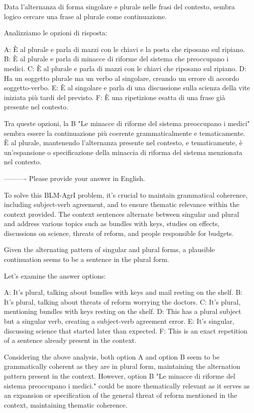 Data l'alternanza di forma singolare e plurale nelle frasi del contesto, sembra logico cercare una frase al plurale come continuazione.

Analizziamo le opzioni di risposta:

A: È al plurale e parla di mazzi con le chiavi e la posta che riposano sul ripiano.
B: È al plurale e parla di minacce di riforme del sistema che preoccupano i medici.
C: È al plurale e parla di mazzi con le chiavi che riposano sul ripiano.
D: Ha un soggetto plurale ma un verbo al singolare, creando un errore di accordo soggetto-verbo.
E: È al singolare e parla di una discussione sulla scienza della vite iniziata più tardi del previsto.
F: È una ripetizione esatta di una frase già presente nel contesto.

Tra queste opzioni, la B "Le minacce di riforme del sistema preoccupano i medici" sembra essere la continuazione più coerente grammaticalmente e tematicamente. È al plurale, mantenendo l'alternanza presente nel contesto, e tematicamente, è un'espansione o specificazione della minaccia di riforma del sistema menzionata nel contesto.

----------
Please provide your answer in English.

To solve this BLM-AgrI problem, it’s crucial to maintain grammatical coherence, including subject-verb agreement, and to ensure thematic relevance within the context provided. The context sentences alternate between singular and plural and address various topics such as bundles with keys, studies on effects, discussions on science, threats of reform, and people responsible for budgets.

Given the alternating pattern of singular and plural forms, a plausible continuation seems to be a sentence in the plural form.

Let's examine the answer options:

A: It’s plural, talking about bundles with keys and mail resting on the shelf.
B: It’s plural, talking about threats of reform worrying the doctors.
C: It’s plural, mentioning bundles with keys resting on the shelf.
D: This has a plural subject but a singular verb, creating a subject-verb agreement error.
E: It’s singular, discussing science that started later than expected.
F: This is an exact repetition of a sentence already present in the context.

Considering the above analysis, both option A and option B seem to be grammatically coherent as they are in plural form, maintaining the alternation pattern present in the context. However, option B "Le minacce di riforme del sistema preoccupano i medici." could be more thematically relevant as it serves as an expansion or specification of the general threat of reform mentioned in the context, maintaining thematic coherence.

